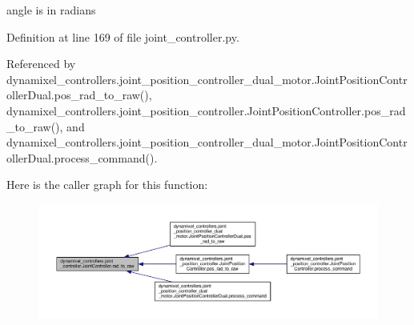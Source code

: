 \begin{DoxyVerb}angle is in radians \end{DoxyVerb}
 

Definition at line 169 of file joint\+\_\+controller.\+py.



Referenced by dynamixel\+\_\+controllers.\+joint\+\_\+position\+\_\+controller\+\_\+dual\+\_\+motor.\+Joint\+Position\+Controller\+Dual.\+pos\+\_\+rad\+\_\+to\+\_\+raw(), dynamixel\+\_\+controllers.\+joint\+\_\+position\+\_\+controller.\+Joint\+Position\+Controller.\+pos\+\_\+rad\+\_\+to\+\_\+raw(), and dynamixel\+\_\+controllers.\+joint\+\_\+position\+\_\+controller\+\_\+dual\+\_\+motor.\+Joint\+Position\+Controller\+Dual.\+process\+\_\+command().


Here is the caller graph for this function\+:
\nopagebreak
\begin{figure}[H]
\begin{center}
\leavevmode
\includegraphics[width=350pt]{d3/dcd/classdynamixel__controllers_1_1joint__controller_1_1_joint_controller_aea21e76e178029b31cd40b3e0335b621_icgraph}
\end{center}
\end{figure}
\mbox{\label{classdynamixel__controllers_1_1joint__controller_1_1_joint_controller_a58a58e669c2918d00cc358f2b58d061c}} 
